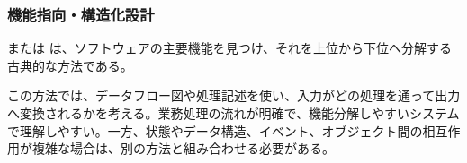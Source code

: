 \subsubsection{機能指向・構造化設計}

 または は、ソフトウェアの主要機能を見つけ、それを上位から下位へ分解する古典的な方法である。

この方法では、データフロー図や処理記述を使い、入力がどの処理を通って出力へ変換されるかを考える。業務処理の流れが明確で、機能分解しやすいシステムで理解しやすい。一方、状態やデータ構造、イベント、オブジェクト間の相互作用が複雑な場合は、別の方法と組み合わせる必要がある。
